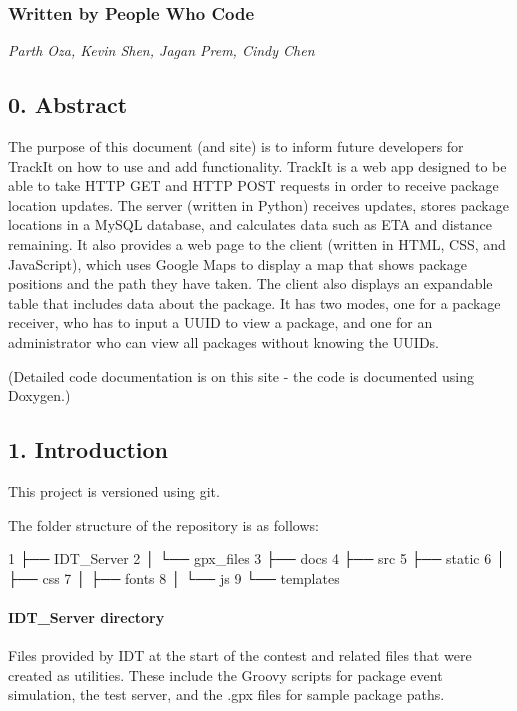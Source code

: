 \subsubsection*{Written by People Who Code}

{\itshape  Parth Oza, Kevin Shen, Jagan Prem, Cindy Chen }

\subsection*{0. Abstract}

The purpose of this document (and site) is to inform future developers for Track\+It on how to use and add functionality. Track\+It is a web app designed to be able to take H\+T\+TP G\+ET and H\+T\+TP P\+O\+ST requests in order to receive package location updates. The server (written in Python) receives updates, stores package locations in a My\+S\+QL database, and calculates data such as E\+TA and distance remaining. It also provides a web page to the client (written in H\+T\+ML, C\+SS, and Java\+Script), which uses Google Maps to display a map that shows package positions and the path they have taken. The client also displays an expandable table that includes data about the package. It has two modes, one for a package receiver, who has to input a U\+U\+ID to view a package, and one for an administrator who can view all packages without knowing the U\+U\+I\+Ds.

(Detailed code documentation is on this site -\/ the code is documented using Doxygen.)

\subsection*{1. Introduction}

This project is versioned using {\ttfamily git}.

The folder structure of the repository is as follows\+:


\begin{DoxyCode}
1 ├── IDT\_Server
2 │   └── gpx\_files
3 ├── docs
4 ├── src
5 ├── static
6 │   ├── css
7 │   ├── fonts
8 │   └── js
9 └── templates
\end{DoxyCode}


\paragraph*{{\ttfamily I\+D\+T\+\_\+\+Server} directory}

Files provided by I\+DT at the start of the contest and related files that were created as utilities. These include the Groovy scripts for package event simulation, the test server, and the .gpx files for sample package paths.

